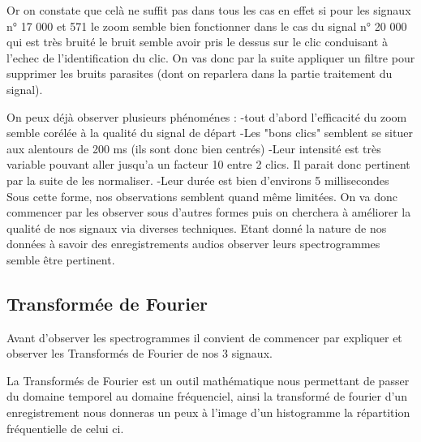 Or on constate que celà ne suffit pas dans tous les cas en effet si pour les signaux n° 17 000 et 571 le zoom semble bien fonctionner dans le cas du signal n° 20 000 qui est très bruité le bruit semble avoir pris le dessus sur le clic conduisant à l'echec de l'identification du clic.
On vas donc par la suite appliquer un filtre pour supprimer les bruits parasites (dont on reparlera dans la partie traitement du signal).

On peux déjà observer plusieurs phénoménes :
-tout d'abord l'efficacité du zoom semble corélée à la qualité du signal de départ
-Les "bons clics" semblent se situer aux alentours de 200 ms (ils sont donc bien centrés)
-Leur intensité est très  variable pouvant aller jusqu'a un facteur 10 entre 2 clics. Il parait donc pertinent par la suite de les normaliser.
-Leur durée est bien d'environs 5 millisecondes
Sous cette forme, nos observations semblent quand même limitées. On va donc commencer par les observer sous d'autres formes puis on cherchera à améliorer la qualité de nos signaux via diverses techniques. Etant donné la nature de nos données à savoir des enregistrements audios observer leurs spectrogrammes semble être pertinent.

\hypertarget{Transformuxe9-de-Fourier}{%
\subsection{Transformée de Fourier}
\label{Transformuxe9-de-Fourier}}

Avant d'observer les spectrogrammes il convient de commencer par expliquer et observer les Transformés de Fourier de nos 3 signaux.

La Transformés de Fourier est un outil mathématique nous permettant de passer du domaine temporel au domaine fréquenciel, ainsi la transformé de fourier d'un enregistrement nous donneras un peux à l'image d'un histogramme la répartition fréquentielle de celui ci.

